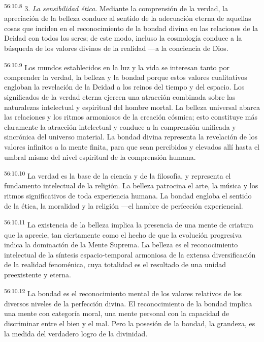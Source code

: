 \par
\textsuperscript{56:10.8} 3. \textit{La sensibilidad ética}. Mediante la comprensión de la verdad, la apreciación de la belleza conduce al sentido de la adecuación eterna de aquellas cosas que inciden en el reconocimiento de la bondad divina en las relaciones de la Deidad con todos los seres; de este modo, incluso la cosmología conduce a la búsqueda de los valores divinos de la realidad ---a la conciencia de Dios.

\par
\textsuperscript{56:10.9} Los mundos establecidos en la luz y la vida se interesan tanto por comprender la verdad, la belleza y la bondad porque estos valores cualitativos engloban la revelación de la Deidad a los reinos del tiempo y del espacio. Los significados de la verdad eterna ejercen una atracción combinada sobre las naturalezas intelectual y espiritual del hombre mortal. La belleza universal abarca las relaciones y los ritmos armoniosos de la creación cósmica; esto constituye más claramente la atracción intelectual y conduce a la comprensión unificada y sincrónica del universo material. La bondad divina representa la revelación de los valores infinitos a la mente finita, para que sean percibidos y elevados allí hasta el umbral mismo del nivel espiritual de la comprensión humana.

\par
\textsuperscript{56:10.10} La verdad es la base de la ciencia y de la filosofía, y representa el fundamento intelectual de la religión. La belleza patrocina el arte, la música y los ritmos significativos de toda experiencia humana. La bondad engloba el sentido de la ética, la moralidad y la religión ---el hambre de perfección experiencial.

\par
\textsuperscript{56:10.11} La existencia de la belleza implica la presencia de una mente de criatura que la aprecie, tan ciertamente como el hecho de que la evolución progresiva indica la dominación de la Mente Suprema. La belleza es el reconocimiento intelectual de la síntesis espacio-temporal armoniosa de la extensa diversificación de la realidad fenoménica, cuya totalidad es el resultado de una unidad preexistente y eterna.

\par
\textsuperscript{56:10.12} La bondad es el reconocimiento mental de los valores relativos de los diversos niveles de la perfección divina. El reconocimiento de la bondad implica una mente con categoría moral, una mente personal con la capacidad de discriminar entre el bien y el mal. Pero la posesión de la bondad, la grandeza, es la medida del verdadero logro de la divinidad.

